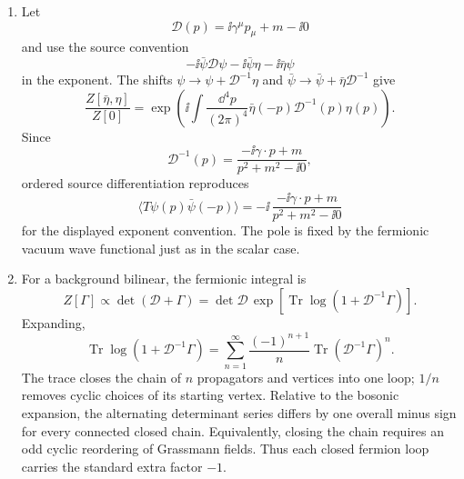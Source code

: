 \begin{enumerate}
\begin{enumerate}
which supplies the minus sign.  This is the finite-dimensional origin of
the sign rule for interchanging fermion lines.
\item
Let
\[
 \mathcal D(p)=\ii\gamma^\mu p_\mu+m-\ii0
\]
and use the source convention
\[
 -\ii\bar\psi\mathcal D\psi-\ii\bar\psi\eta-\ii\bar\eta\psi
\]
in the exponent.  The shifts
\(\psi\to\psi+\mathcal D^{-1}\eta\) and
\(\bar\psi\to\bar\psi+\bar\eta\mathcal D^{-1}\) give
\[
 \frac{Z[\bar\eta,\eta]}{Z[0]}
 =\exp\left(\ii\int\frac{\dd^4p}{(2\pi)^4}
 \bar\eta(-p)\mathcal D^{-1}(p)\eta(p)\right).
\]
Since
\[
 \mathcal D^{-1}(p)=
 \frac{-\ii\gamma\cdot p+m}
 {p^2+m^2-\ii0},
\]
ordered source differentiation reproduces
\[
 \langle T\psi(p)\bar\psi(-p)\rangle
 =-\ii\,\frac{-\ii\gamma\cdot p+m}
 {p^2+m^2-\ii0}
\]
for the displayed exponent convention.  The pole is fixed by the
fermionic vacuum wave functional just as in the scalar case.
\item
For a background bilinear, the fermionic integral is
\[
 Z[\Gamma]\propto\det(\mathcal D+\Gamma)
 =\det\mathcal D\,
 \exp\left[\operatorname{Tr}\log
 (1+\mathcal D^{-1}\Gamma)\right].
\]
Expanding,
\[
 \operatorname{Tr}\log(1+\mathcal D^{-1}\Gamma)
 =\sum_{n=1}^{\infty}\frac{(-1)^{n+1}}n
 \operatorname{Tr}(\mathcal D^{-1}\Gamma)^n.
\]
The trace closes the chain of \(n\) propagators and vertices into one loop;
\(1/n\) removes cyclic choices of its starting vertex.  Relative to the
bosonic expansion, the alternating determinant series differs by one
overall minus sign for every connected closed chain.  Equivalently, closing
the chain requires an odd cyclic reordering of Grassmann fields.  Thus each
closed fermion loop carries the standard extra factor \(-1\).
\end{enumerate}


\end{enumerate}
